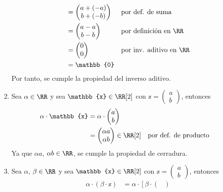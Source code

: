 \begin{examplebox}{}{}
\begin{enumerate}[label=\roman*), topsep=6pt, itemsep=0pt]
\begin{align*}
            & = \begin{pmatrix}
                a + (-a) \\
                b + (-b)
            \end{pmatrix} && \text{por def. de suma} \\
            & = \begin{pmatrix}
                a - a \\
                b - b
            \end{pmatrix} && \text{por definición en $\RR$} \\
            & = \begin{pmatrix}
                0 \\
                0
            \end{pmatrix} && \text{por inv. aditivo en $\RR$} \\
            & = \mathbb{0}
        \end{align*}
        Por tanto, se cumple la propiedad del inverso aditivo.
        \item Sea $\alpha \in \RR$ y sea $\mathbb{x} \in \RR[2]$ con $\mathbb{x} = \begin{pmatrix}
            a \\
            b
        \end{pmatrix}$, entonces
        \begin{align*}
            \alpha \cdot \mathbb{x} & = \alpha \cdot \begin{pmatrix}
                a \\
                b
            \end{pmatrix} \\
            & = \begin{pmatrix}
                \alpha a \\
                \alpha b
            \end{pmatrix} \in \RR[2] && \text{por def. de producto}
        \end{align*}
        Ya que $\alpha a$, $\alpha b \in \RR$, se cumple la propiedad de cerradura.
        \item Sea $\alpha$, $\beta \in \RR$ y sea $\mathbb{x} \in \RR[2]$ con $\mathbb{x} = \begin{pmatrix}
            a \\
            b
        \end{pmatrix}$, entonces
        \begin{align*}
            \alpha \cdot (\beta \cdot \mathbb{x}) & = \alpha \cdot \left[ \beta \cdot \begin{pmatrix}

\end{pmatrix}
\end{align*}
\end{enumerate}
\end{examplebox}
